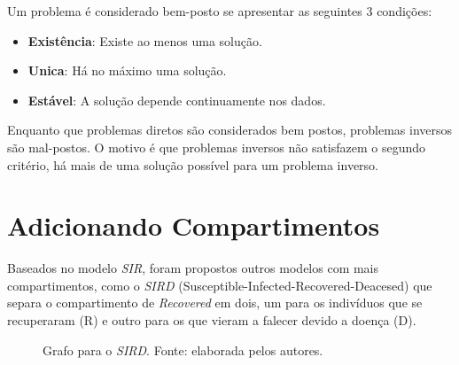 Um problema é considerado bem-posto se apresentar as seguintes 3 condições:

\begin{itemize}
    \item \textbf{Existência}: Existe ao menos uma solução. 
    \item \textbf{Unica}: Há no máximo uma solução.
    \item \textbf{Estável}: A solução depende continuamente nos dados.  
\end{itemize}

Enquanto que problemas diretos são considerados bem postos, problemas inversos 
são mal-postos. O motivo é que problemas inversos não satisfazem o segundo critério,
há mais de uma solução possível para um problema inverso.

\section{Adicionando Compartimentos}

Baseados no modelo \textit{SIR}, foram propostos outros modelos com mais 
compartimentos, como o \textit{SIRD} (Susceptible-Infected-Recovered-Deacesed) 
\cite{giles:77-sird} que separa o compartimento de \textit{Recovered} em dois, um
para os indivíduos que se recuperaram (R) e outro para os que vieram a falecer devido
a doença (D).

\begin{figure}[H]
\centering
{}
\caption{Grafo para o \textit{SIRD}. Fonte: elaborada pelos autores.}
\label{fig:sird-grafo}
\end{figure}


